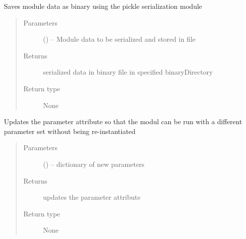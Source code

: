 \documentclass[letterpaper,10pt,english]{sphinxmanual}
\begin{document}
\begin{fulllineitems}
\begin{fulllineitems}
\label{\detokenize{MouseReferenceManual:Modules.Base.ModuleBaseClass.saveData}}
Saves module data as binary using the pickle serialization module
\begin{quote}\begin{description}
\item[{Parameters}] \leavevmode
{} () -- Module data to be serialized and stored in file

\item[{Returns}] \leavevmode
serialized data in binary file in specified binaryDirectory

\item[{Return type}] \leavevmode
None

\end{description}\end{quote}

\end{fulllineitems}


\begin{fulllineitems}
\label{\detokenize{MouseReferenceManual:Modules.Base.ModuleBaseClass.updateParameters}}
Updates the parameter attribute so that the modul can be run with a different parameter set without being re-instantiated
\begin{quote}\begin{description}
\item[{Parameters}] \leavevmode
{} () -- dictionary of new parameters

\item[{Returns}] \leavevmode
updates the parameter attribute

\item[{Return type}] \leavevmode
None

\end{description}\end{quote}

\end{fulllineitems}


\end{fulllineitems}

\end{document}
